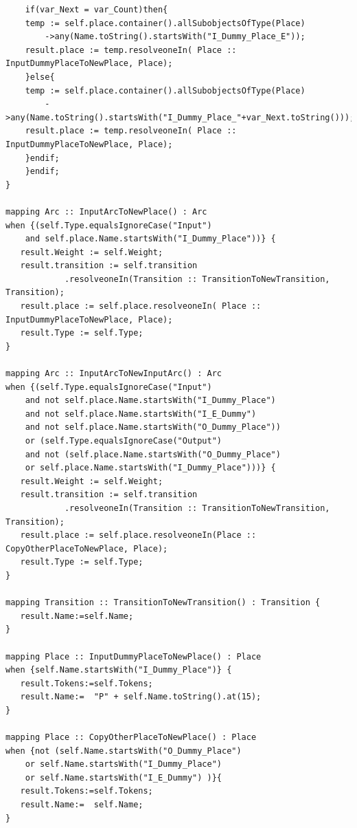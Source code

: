 \begin{verbatim}
	if(var_Next = var_Count)then{
	temp := self.place.container().allSubobjectsOfType(Place)
		->any(Name.toString().startsWith("I_Dummy_Place_E"));
	result.place := temp.resolveoneIn( Place :: InputDummyPlaceToNewPlace, Place);
	}else{   
	temp := self.place.container().allSubobjectsOfType(Place)
		->any(Name.toString().startsWith("I_Dummy_Place_"+var_Next.toString()));
	result.place := temp.resolveoneIn( Place :: InputDummyPlaceToNewPlace, Place);
	}endif;
	}endif;     
}

mapping Arc :: InputArcToNewPlace() : Arc
when {(self.Type.equalsIgnoreCase("Input") 
	and self.place.Name.startsWith("I_Dummy_Place"))} {
   result.Weight := self.Weight;
   result.transition := self.transition
			.resolveoneIn(Transition :: TransitionToNewTransition, Transition);
   result.place := self.place.resolveoneIn( Place :: InputDummyPlaceToNewPlace, Place);
   result.Type := self.Type;      
}

mapping Arc :: InputArcToNewInputArc() : Arc
when {(self.Type.equalsIgnoreCase("Input") 
	and not self.place.Name.startsWith("I_Dummy_Place") 
	and not self.place.Name.startsWith("I_E_Dummy") 
	and not self.place.Name.startsWith("O_Dummy_Place")) 
	or (self.Type.equalsIgnoreCase("Output") 
	and not (self.place.Name.startsWith("O_Dummy_Place")
	or self.place.Name.startsWith("I_Dummy_Place")))} {
   result.Weight := self.Weight;
   result.transition := self.transition
			.resolveoneIn(Transition :: TransitionToNewTransition, Transition);
   result.place := self.place.resolveoneIn(Place :: CopyOtherPlaceToNewPlace, Place);
   result.Type := self.Type;      
}

mapping Transition :: TransitionToNewTransition() : Transition {
   result.Name:=self.Name;         
}	
	
mapping Place :: InputDummyPlaceToNewPlace() : Place
when {self.Name.startsWith("I_Dummy_Place")} {
   result.Tokens:=self.Tokens;
   result.Name:=  "P" + self.Name.toString().at(15);      
}

mapping Place :: CopyOtherPlaceToNewPlace() : Place 
when {not (self.Name.startsWith("O_Dummy_Place")
 	or self.Name.startsWith("I_Dummy_Place")
 	or self.Name.startsWith("I_E_Dummy") )}{
   result.Tokens:=self.Tokens;
   result.Name:=  self.Name;     
}			
\end{verbatim}


